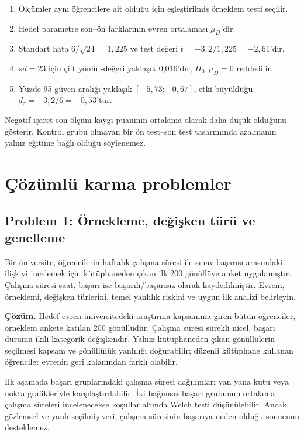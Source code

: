 \begin{enumerate}
  \item Ölçümler aynı öğrencilere ait olduğu için eşleştirilmiş örneklem \tstat testi seçilir.
  \item Hedef parametre son--ön farklarının evren ortalaması $\mu_D$'dir.
  \item Standart hata $6/\sqrt{24}=1{,}225$ ve test değeri
  $t=-3{,}2/1{,}225=-2{,}61$'dir.
  \item $sd=23$ için çift yönlü \pval-değeri yaklaşık 0,016'dır; $H_0:\mu_D=0$ reddedilir.
  \item Yüzde 95 güven aralığı yaklaşık $[-5{,}73;-0{,}67]$, etki büyüklüğü
  $d_z=-3{,}2/6=-0{,}53$'tür.
\end{enumerate}

Negatif işaret son ölçüm kaygı puanının ortalama olarak daha düşük olduğunu
gösterir. Kontrol grubu olmayan bir ön test--son test tasarımında azalmanın
yalnız eğitime bağlı olduğu söylenemez.

\section{Çözümlü karma problemler}

\subsection*{Problem 1: Örnekleme, değişken türü ve genelleme}

Bir üniversite, öğrencilerin haftalık çalışma süresi ile sınav başarısı
arasındaki ilişkiyi incelemek için kütüphaneden çıkan ilk 200 gönüllüye anket
uygulamıştır. Çalışma süresi saat, başarı ise başarılı/başarısız olarak
kaydedilmiştir. Evreni, örneklemi, değişken türlerini, temel yanlılık riskini
ve uygun ilk analizi belirleyin.

\textbf{Çözüm.} Hedef evren üniversitedeki araştırma kapsamına giren bütün
öğrenciler, örneklem ankete katılan 200 gönüllüdür. Çalışma süresi sürekli
nicel, başarı durumu ikili kategorik değişkendir. Yalnız kütüphaneden çıkan
gönüllülerin seçilmesi kapsam ve gönüllülük yanlılığı doğurabilir; düzenli
kütüphane kullanan öğrenciler evrenin geri kalanından farklı olabilir.

İlk aşamada başarı gruplarındaki çalışma süresi dağılımları yan yana kutu veya
nokta grafikleriyle karşılaştırılabilir. İki bağımsız başarı grubunun ortalama
çalışma süreleri incelenecekse koşullar altında Welch \tstat testi düşünülebilir.
Ancak gözlemsel ve yanlı seçilmiş veri, çalışma süresinin başarıya neden
olduğu sonucunu desteklemez.

